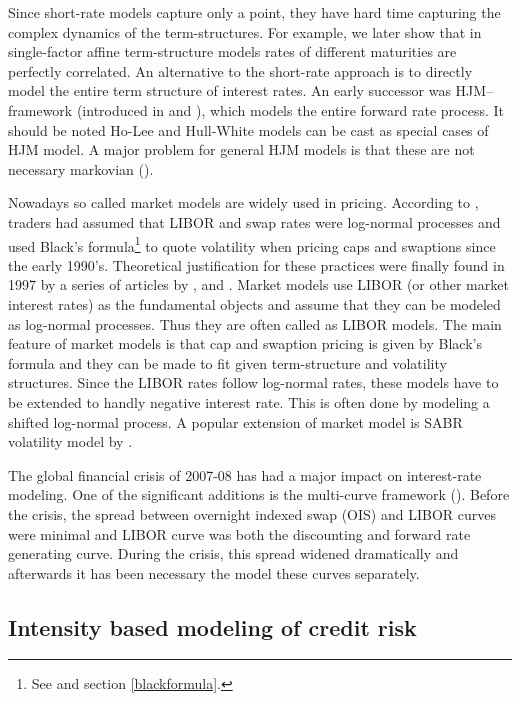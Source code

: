 Since short-rate models capture only a point, they have hard time capturing the complex dynamics of the term-structures. For example, we later show that in single-factor affine term-structure models rates of different maturities are perfectly correlated. An alternative to the short-rate approach is to directly model the entire term structure of interest rates. An early successor was HJM--framework  (introduced in \cite{HJM1990bondpricing} and \cite{HJM1992bondpricing}), which models the entire forward rate process. It should be noted Ho-Lee and Hull-White models can be cast as special cases of HJM model. A major problem for general HJM models is that these are not necessary markovian (\cite{ritchken1995volatility}).

Nowadays so called market models are widely used in pricing. According to \textcite[p. 182]{wu2009interest}, traders had assumed that LIBOR and swap rates were log-normal processes and used Black's formula\footnote{See \textcite{black1976pricing} and section \ref{blackformula}.} to quote volatility when pricing caps and swaptions since the early 1990's. Theoretical justification for these practices were finally found in 1997 by a series of articles by \cite{bracegatarek1997market}, \textcite{miltersen1997closed} and \textcite{jamshidian1997libor}. Market models use LIBOR (or other market interest rates) as the fundamental objects and assume that they can be modeled as log-normal processes. Thus they are often called as LIBOR models. The main feature of market models is that cap and swaption pricing is given by Black's formula and they can be made to fit given term-structure and volatility structures. Since the LIBOR rates follow log-normal rates, these models have to be extended to handly negative interest rate. This is often done by modeling a shifted log-normal process. A popular extension of market model is SABR volatility model by \textcite{hagan2002managing}.

The global financial crisis of 2007-08 has had a major impact on interest-rate modeling. One of the significant additions is the multi-curve framework (\textcite{mercurio2009interest}). Before the crisis, the spread between overnight indexed swap (OIS) and LIBOR curves were minimal and LIBOR curve was both the discounting and forward rate generating curve. During the crisis, this spread widened dramatically and afterwards it has been necessary the model these curves separately. 

\subsection{Intensity based modeling of credit risk}

